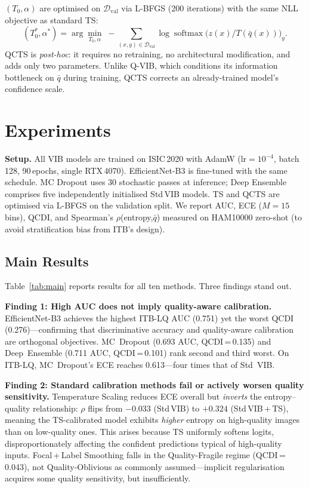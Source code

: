 \documentclass{bmvc2k}
\newcommand{\qbar}{\bar{q}}
\newcommand{\D}{\mathcal{D}}
\begin{document}
$(T_0,\alpha)$ are optimised on $\D_\text{val}$ via L-BFGS (200 iterations)
with the same NLL objective as standard TS:
\begin{equation}
(T_0^*,\alpha^*)=\arg\min_{T_0,\alpha}\;
  {-}\!\sum_{(x,y)\in\D_\text{val}}\!\log \operatorname{softmax}\!\bigl(z(x)/T(\qbar(x))\bigr)_y.
\label{eq:qcts_opt}
\end{equation}
QCTS is \emph{post-hoc}: it requires no retraining, no architectural
modification, and adds only two parameters. Unlike Q-VIB, which conditions its
information bottleneck on $\qbar$ during training, QCTS corrects an already-trained
model's confidence scale.

\section{Experiments}
\label{sec:experiments}

\textbf{Setup.}
All VIB models are trained on ISIC\,2020 with AdamW ($\text{lr}{=}10^{-4}$,
batch\,128, 90\,epochs, single RTX\,4070). EfficientNet-B3 is fine-tuned with
the same schedule. MC Dropout uses 30 stochastic passes at inference; Deep
Ensemble comprises five independently initialised Std\,VIB models. TS and QCTS
are optimised via L-BFGS on the validation split. We report AUC, ECE ($M{=}15$
bins), QCDI, and Spearman's $\rho$(entropy,$\qbar$) measured on HAM10000
zero-shot (to avoid stratification bias from ITB's design).

\subsection{Main Results}
\label{sec:main_results}

Table~\ref{tab:main} reports results for all ten methods. Three findings stand out.

\textbf{Finding 1: High AUC does not imply quality-aware calibration.}
EfficientNet-B3 achieves the highest ITB-LQ AUC (0.751) yet the worst QCDI
(0.276)---confirming that discriminative accuracy and quality-aware calibration
are orthogonal objectives. MC~Dropout (0.693 AUC, QCDI\,=\,0.135) and
Deep~Ensemble (0.711 AUC, QCDI\,=\,0.101) rank second and third worst.
On ITB-LQ, MC~Dropout's ECE reaches 0.613---four times that of Std~VIB.

\textbf{Finding 2: Standard calibration methods fail or actively worsen quality
sensitivity.} Temperature Scaling reduces ECE overall but \emph{inverts} the
entropy--quality relationship: $\rho$ flips from $-0.033$ (Std\,VIB) to
$+0.324$ (Std\,VIB\,+\,TS), meaning the TS-calibrated model exhibits
\emph{higher} entropy on high-quality images than on low-quality ones. This
arises because TS uniformly softens logits, disproportionately affecting the
confident predictions typical of high-quality inputs. Focal\,+\,Label
Smoothing falls in the Quality-Fragile regime (QCDI\,=\,0.043), not
Quality-Oblivious as commonly assumed---implicit regularisation acquires some
quality sensitivity, but insufficiently.
\end{document}
